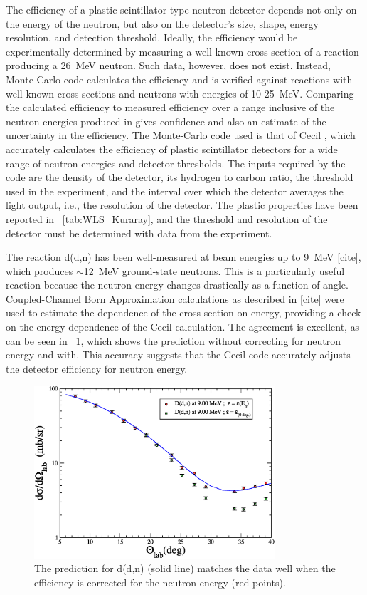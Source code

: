 The efficiency of a plastic-scintillator-type neutron detector depends not only on the energy of the neutron, but also on the detector's size, shape, energy resolution, and detection threshold.  Ideally, the efficiency would be experimentally determined by measuring a well-known cross section of a reaction producing a 26~MeV neutron.  Such data, however, does not exist.  Instead, Monte-Carlo code calculates the efficiency and is verified against reactions with well-known cross-sections and neutrons with energies of 10-25~MeV.  Comparing the calculated efficiency to measured efficiency over a range inclusive of the neutron energies produced in \reaction gives confidence and also an estimate of the uncertainty in the efficiency.  The Monte-Carlo code used is that of Cecil \cite{Cecil_neutEfficiency}, which accurately calculates the efficiency of plastic scintillator detectors for a wide range of neutron energies and detector thresholds.  The inputs required by the code are the density of the detector, its hydrogen to carbon ratio, the threshold used in the experiment, and the interval over which the detector averages the light output, i.e., the resolution of the detector.  The plastic properties have been reported in {\tab}~\ref{tab:WLS_Kuraray}, and the threshold and resolution of the detector must be determined with data from the experiment.  

The reaction d(d,n) has been well-measured at beam energies up to 9~MeV [cite], which produces $\sim$12~MeV ground-state neutrons.  This is a particularly useful reaction because the neutron energy changes drastically as a function of angle.  Coupled-Channel Born Approximation calculations as described in [cite] were used to estimate the dependence of the cross section on energy, providing a check on the energy dependence of the Cecil calculation.  The agreement is excellent, as can be seen in {\fig}~\ref{fig:DeuteriumMatch}, which shows the prediction without correcting for neutron energy and with.  This accuracy suggests that the Cecil code accurately adjusts the detector efficiency for neutron energy.  
\begin{figure}[!htbp]
\centering
\includegraphics[width=0.8\textwidth]{figures/deuteriumMatch.eps}
\caption{The prediction for d(d,n) (solid line) matches the data well when the efficiency is corrected for the neutron energy (red points).}
\label{fig:DeuteriumMatch}
\end{figure}

